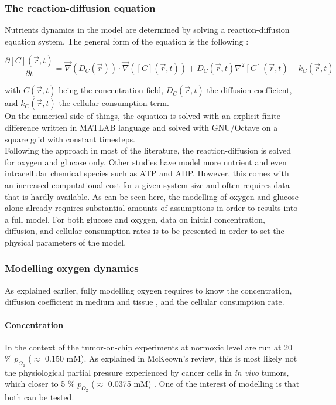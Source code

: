 \documentclass[11pt,a4paper]{article}
\begin{document}
\subsubsection{The reaction-diffusion equation}
Nutrients dynamics in the model are determined by solving a reaction-diffusion equation system. The general form of the equation is the following : 

\[ \frac{\partial [C](\overrightarrow{r},t)}{\partial t} = \overrightarrow{\nabla}(D_C(\overrightarrow{r})) \cdot \overrightarrow{\nabla}( [C](\overrightarrow{r},t)) + D_C(\overrightarrow{r},t) \nabla^2 [C](\overrightarrow{r},t) -k_C(\overrightarrow{r},t) \] 

with  $C(\overrightarrow{r},t)$ being the concentration field, $D_C(\overrightarrow{r},t)$ the diffusion coefficient, and $k_C(\overrightarrow{r},t)$ the cellular consumption term.\\

On the numerical side of things, the equation is solved with an explicit finite difference written in MATLAB language and solved with GNU/Octave on a square grid with constant timesteps.\\

Following the approach in most of the literature, the reaction-diffusion is solved for oxygen and glucose only. Other studies have model more nutrient and even intracellular chemical species such as ATP and ADP. \cite{Jagiella2016}\cite{Cleri2019} However, this comes with an increased computational cost for a given system size and often requires data that is hardly available. As can be seen here, the modelling of oxygen and glucose alone already requires substantial amounts of assumptions in order to results into a full model. For both glucose and oxygen, data on initial concentration, diffusion,  and cellular consumption rates is to be presented in order to set the physical parameters of the model.

\subsubsection{Modelling oxygen dynamics \label{ox}} 
As explained earlier, fully modelling oxygen requires to know the concentration, diffusion coefficient in medium and tissue , and the cellular consumption rate.\\

\paragraph{Concentration}
In the context of the tumor-on-chip experiments at normoxic level are run at 20 \% $p_{O_2}$ ($\approx$ 0.150 mM). As explained in McKeown's review, this is most likely not the physiological partial pressure experienced by cancer cells in \textit{in vivo} tumors, which closer to 5 \%  $p_{O_2}$ ($\approx$ 0.0375 mM) \cite{McKeown2014}. One of the interest of modelling is that both can be tested.\\
\end{document}
